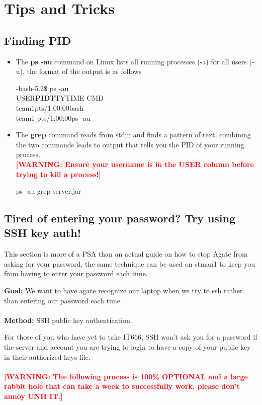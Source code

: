 \documentclass{article}
\newcommand{\gersi}[1]{\textcolor{red}{[#1]}}
\begin{document}
\section{Tips and Tricks}
\label{sec:tips}
\subsection{Finding PID}
\label{sec:PID}
\begin{itemize}
	\item The \textbf{ps -au} command on Linux lists all running processes (-a) for all users (-u), the format of the output is as follows
	      \begin{tcolorbox}
		      -bash-5.2\$ ps -au\\
		      USER\quad\textbf{PID}\quad \quad TTY\quad\;TIME \quad\;CMD\\
		      team1\quad pts/1:00:00\quad bash\\
		      team1\;\;\;\; pts/1:00:00\quad ps -au\\
	      \end{tcolorbox}
	\item The \textbf{grep} command reads from stdin and finds a pattern of text, combining the two commands leads to output that tells you the PID of your running process. \\
	      \textbf{\gersi{WARNING: Ensure your username is in the USER column before trying to kill a process!}}
	      \begin{tcolorbox}
		      ps -au \textbar\; grep server.jar
	      \end{tcolorbox}
\end{itemize}

\subsection{Tired of entering your password? Try using SSH key auth!}
\quad This section is more of a PSA than an actual guide on how to stop Agate from asking for your password, the same technique can be used on stman1 to keep you from having to enter your password each time.
\begin{tcolorbox}
	\textbf{Goal:} We want to have agate recognize our laptop when we try to ssh rather than entering our password each time.\\
	\\
	\textbf{Method:} SSH public key authentication.
\end{tcolorbox}
For those of you who have yet to take IT666, SSH won't ask you for a password if the server and account you are trying to login to have a copy of your public key in their authorized keys file. \\
\\
\textbf{\gersi{WARNING: The following process is 100\% OPTIONAL and a large rabbit hole that can take a week to successfully work, please don't annoy UNH IT.}}\\
\end{document}
